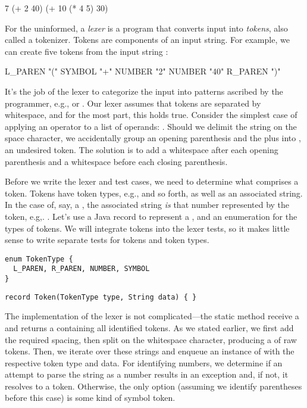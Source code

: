 \newpage %
\begin{verbnobox}[\small]
7
(+ 2 40)
(+ 10 (* 4 5) 30)
\end{verbnobox}

For the uninformed, a \emph{lexer} is a program that converts input into \emph{tokens}, also called a tokenizer. 
Tokens are components of an input string. 
For example, we can create five tokens from the input string : 

\begin{verbnobox}[\small]
L_PAREN "("
SYMBOL "+"
NUMBER "2"
NUMBER "40"
R_PAREN ")"
\end{verbnobox}

It's the job of the lexer to categorize the input into patterns ascribed by the programmer, e.g.,  or . 
Our lexer assumes that tokens are separated by whitespace, and for the most part, this holds true. 
Consider the simplest case of applying an operator to a list of operands: . 
Should we delimit the string on the space character, we accidentally group an opening parenthesis and the plus into , an undesired token. 
The solution is to add a whitespace after each opening parenthesis and a whitespace before each closing parenthesis. 

Before we write the lexer and test cases, we need to determine what comprises a token. 
Tokens have token types, e.g.,  and so forth, as well as an associated string. 
In the case of, say, a , the associated string \emph{is} that number represented by the token, e.g,. . 
Let's use a Java record to represent a , and an enumeration for the types of tokens. 
We will integrate tokens into the lexer tests, so it makes little sense to write separate tests for tokens and token types.

\begin{lstlisting}[language=MyJava]
enum TokenType { 
  L_PAREN, R_PAREN, NUMBER, SYMBOL 
}
\end{lstlisting}

\begin{lstlisting}[language=MyJava]
record Token(TokenType type, String data) { }
\end{lstlisting}

The implementation of the lexer is not complicated---the static  method receive a  and returns a  containing all identified tokens. 
As we stated earlier, we first add the required spacing, then split on the whitespace character, producing a  of raw tokens. 
Then, we iterate over these strings and enqueue an instance of  with the respective token type and data. 
For identifying numbers, we determine if an attempt to parse the string as a number results in an exception and, if not, it resolves to a  token. 
Otherwise, the only option (assuming we identify parentheses before this case) is some kind of symbol token.

